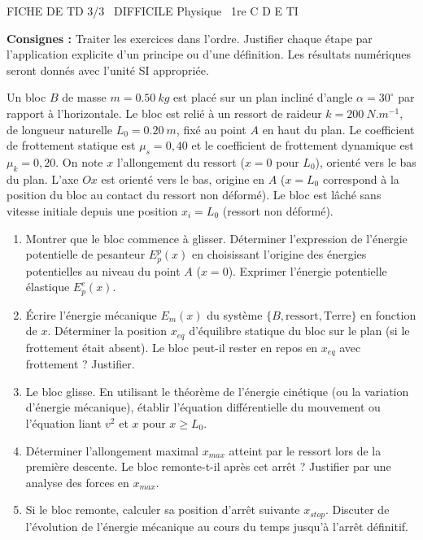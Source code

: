 \documentclass[11pt]{article}
\begin{document}
\begin{tcolorbox}[enhanced,colback=popink,colframe=popink,arc=10pt,boxrule=0pt,left=12pt,right=12pt,top=9pt,bottom=9pt]
{\color{white}\popxbold\small FICHE DE TD 3/3 \textbullet\ DIFFICILE \hfill Physique \textbullet\ 1re C D E TI\par}
\end{tcolorbox}
\vspace{4pt}
\noindent\textbf{Consignes :} Traiter les exercices dans l'ordre. Justifier chaque étape par l'application explicite d'un principe ou d'une définition. Les résultats numériques seront donnés avec l'unité SI appropriée.

\begin{exercice}
Un bloc $B$ de masse $m = \SI{0,50}{kg}$ est placé sur un plan incliné d'angle $\alpha = 30^\circ$ par rapport à l'horizontale. Le bloc est relié à un ressort de raideur $k = \SI{200}{N.m^{-1}}$, de longueur naturelle $L_0 = \SI{0,20}{m}$, fixé au point $A$ en haut du plan. Le coefficient de frottement statique est $\mu_s = 0,40$ et le coefficient de frottement dynamique est $\mu_k = 0,20$. On note $x$ l'allongement du ressort ($x=0$ pour $L_0$), orienté vers le bas du plan. L'axe $Ox$ est orienté vers le bas, origine en $A$ ($x=L_0$ correspond à la position du bloc au contact du ressort non déformé). Le bloc est lâché sans vitesse initiale depuis une position $x_i = L_0$ (ressort non déformé).
\begin{enumerate}
    \item Montrer que le bloc commence à glisser. Déterminer l'expression de l'énergie potentielle de pesanteur $E_p^p(x)$ en choisissant l'origine des énergies potentielles au niveau du point $A$ ($x=0$). Exprimer l'énergie potentielle élastique $E_p^e(x)$.
    \item Écrire l'énergie mécanique $E_m(x)$ du système $\{B, \text{ressort}, \text{Terre}\}$ en fonction de $x$. Déterminer la position $x_{eq}$ d'équilibre statique du bloc sur le plan (si le frottement était absent). Le bloc peut-il rester en repos en $x_{eq}$ avec frottement ? Justifier.
    \item Le bloc glisse. En utilisant le théorème de l'énergie cinétique (ou la variation d'énergie mécanique), établir l'équation différentielle du mouvement ou l'équation liant $v^2$ et $x$ pour $x \ge L_0$. 
    \item Déterminer l'allongement maximal $x_{max}$ atteint par le ressort lors de la première descente. Le bloc remonte-t-il après cet arrêt ? Justifier par une analyse des forces en $x_{max}$.
    \item Si le bloc remonte, calculer sa position d'arrêt suivante $x_{stop}$. Discuter de l'évolution de l'énergie mécanique au cours du temps jusqu'à l'arrêt définitif.
\end{enumerate}
\end{exercice}
\end{document}
